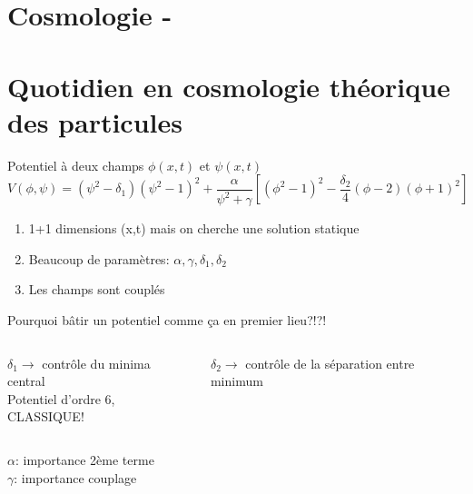 \documentclass[handout]{beamer}
\begin{document}
\section{Cosmologie -  }

\section{Quotidien en cosmologie théorique des particules}
\begin{frame}
\begin{block}{Potentiel à deux champs $\phi(x,t)$ et $\psi(x,t)$}
\begin{equation*}
V(\phi,\psi)=(\psi^2-\delta_1)(\psi^2-1)^2+\frac{\alpha}{\psi^2+\gamma}[(\phi^2-1)^2 - \frac{\delta_2}{4}(\phi-2)(\phi+1)^2] 
\end{equation*}
\begin{enumerate}
\item 1+1 dimensions (x,t) mais on cherche une solution statique
\item Beaucoup de paramètres: $\alpha, \gamma, \delta_1, \delta_2$
\item Les champs sont couplés
\end{enumerate}
\end{block}
\end{frame}

\begin{frame}
Pourquoi bâtir un potentiel comme ça en premier lieu?!?!\\


\begin{columns}
    \begin{column}{.5\linewidth}
   \begin{figure}[0.3\textwidth]
    \end{figure}
   $\delta_1 \rightarrow$ contrôle du minima central\\
    Potentiel d'ordre 6, CLASSIQUE!\\    
    \end{column}
    \begin{column}{.5\linewidth}
    \begin{figure}[0.3\textwidth]
    \end{figure}
   $\delta_2 \rightarrow$ contrôle de la séparation entre minimum \\
    \end{column}
  \end{columns}
 $\alpha$: importance 2ème terme \\
 $\gamma$: importance couplage \\
\end{frame}
\end{document}
